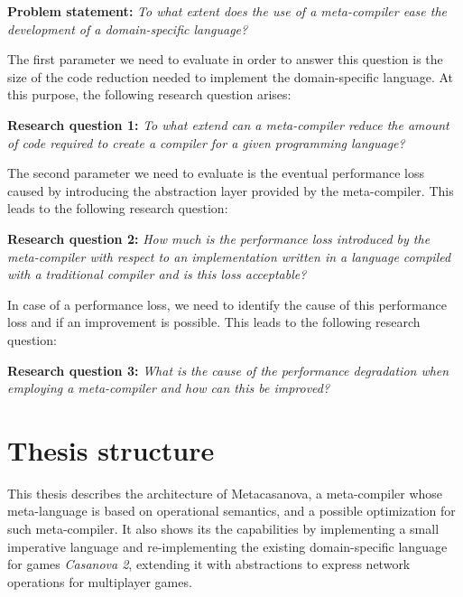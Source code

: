 \vspace{0.5cm}
\noindent
\textbf{Problem statement: } \textit{To what extent does the use of a meta-compiler ease the development of a domain-specific language?}

\vspace{0.5cm}
\noindent
The first parameter we need to evaluate in order to answer this question is the size of the code reduction needed to implement the domain-specific language. At this purpose, the following research question arises:

\vspace{0.5cm}
\noindent
\textbf{Research question 1: } \textit{To what extend can a meta-compiler reduce the amount of code required to create a compiler for a given programming language?}

\vspace{0.5cm}
\noindent
The second parameter we need to evaluate is the eventual performance loss caused by introducing the abstraction layer provided by the meta-compiler. This leads to the following research question:

\vspace{0.5cm}
\noindent
\textbf{Research question 2: } \textit{How much is the performance loss introduced by the meta-compiler with respect to an implementation written in a language compiled with a traditional compiler and is this loss acceptable?}

\vspace{0.5cm}
\noindent
In case of a performance loss, we need to identify the cause of this performance loss and if an improvement is possible. This leads to the following research question:

\vspace{0.5cm}
\noindent
\textbf{Research question 3: } \textit{What is the cause of the performance degradation when employing a meta-compiler and how can this be improved?}

\vspace{0.5cm}
\noindent

\section{Thesis structure}
This thesis describes the architecture of Metacasanova, a meta-compiler whose meta-language is based on operational semantics, and a possible optimization for such meta-compiler. It also shows its the capabilities by implementing a small imperative language and re-implementing the existing domain-specific language for games \textit{Casanova 2}, extending it with abstractions to express network operations for multiplayer games.

